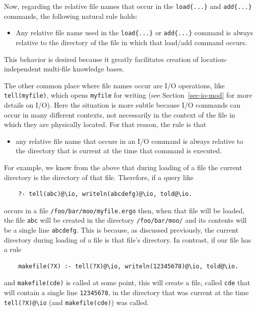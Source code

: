 \documentclass[11pt]{article}
\newcommand{\bs}{\textbackslash}
\begin{document}
Now, regarding the relative file names
that occur in the \texttt{load\{...\}} and \texttt{add\{...\}} commands,
the following natural rule holds:
\begin{itemize}
\item  Any relative file name used in the \texttt{load\{...\}} or
  \texttt{add\{...\}} command is always relative to the directory of the
  file in which that load/add command occurs.  
\end{itemize}
This behavior is desired because it greatly facilitates creation of
location-independent multi-file knowledge bases.

The other common place where file names occur are I/O
operations, like \texttt{tell(myfile)}, which opens \texttt{myfile} for
writing (see Section~\ref{sec-io-mod} for more details on I/O).  
Here the situation is more subtle because I/O commands can occur in
many different contexts, not necessarily in the context of the file in
which they are physically located. For that reason,
the rule is that
\begin{itemize}
\item  any relative file name that occurs in an I/O command is always
  relative to the directory that is current at the time that command is
  executed.
\end{itemize}
For example, we know from the above that during loading of a file the
current directory is the directory of that file. Therefore, if a query like
\begin{verbatim}
    ?- tell(abc)@\io, writeln(abcdefg)@\io, told@\io.
\end{verbatim}
occurs in a file \texttt{/foo/bar/moo/myfile.ergo} then, when that file will
be loaded, the file
\texttt{abc} will be created in the directory
\texttt{/foo/bar/moo/} and its contents will be a single line \texttt{abcdefg}. 
This is because, as discussed previously, the current directory during loading of a
file is that file's directory.
In contrast, if our file has a rule
\begin{verbatim}
    makefile(?X) :- tell(?X)@\io, writeln(12345678)@\io, told@\io.
\end{verbatim}
and \texttt{makefile(cde)} is called at some point, this will create a
file, called \texttt{cde} that will contain a single line   \texttt{12345678},
in the directory that was current at the time \texttt{tell(?X)@\bs{}io} (and
\texttt{makefile(cde)}) was called. 
\end{document}
